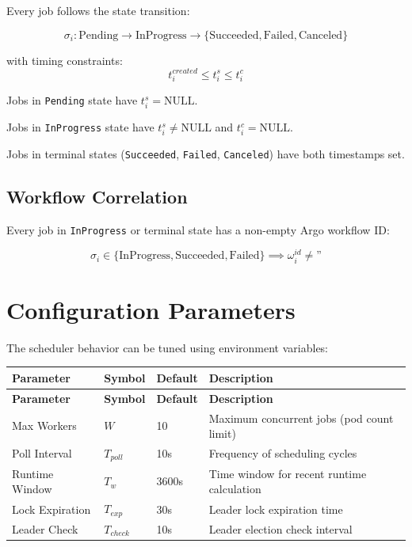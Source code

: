 \documentclass[11pt]{article}
\begin{document}
Every job follows the state transition:

\begin{equation}
\sigma_i: \text{Pending} \to \text{InProgress} \to \{\text{Succeeded}, \text{Failed}, \text{Canceled}\}
\end{equation}

with timing constraints:
\begin{equation}
t_i^{created} \leq t_i^s \leq t_i^c
\end{equation}

Jobs in \texttt{Pending} state have $t_i^s = \text{NULL}$.

Jobs in \texttt{InProgress} state have $t_i^s \neq \text{NULL}$ and $t_i^c = \text{NULL}$.

Jobs in terminal states (\texttt{Succeeded}, \texttt{Failed}, \texttt{Canceled}) have both timestamps set.

\subsection{Workflow Correlation}

Every job in \texttt{InProgress} or terminal state has a non-empty Argo workflow ID:

\begin{equation}
\sigma_i \in \{\text{InProgress}, \text{Succeeded}, \text{Failed}\} \implies \omega_i^{id} \neq \text{''}
\end{equation}

\section{Configuration Parameters}

The scheduler behavior can be tuned using environment variables:

\begin{center}
\begin{longtable}{p{3.5cm}p{1.5cm}p{2cm}p{7cm}}
\toprule
\textbf{Parameter} & \textbf{Symbol} & \textbf{Default} & \textbf{Description} \\
\midrule
\endfirsthead

\toprule
\textbf{Parameter} & \textbf{Symbol} & \textbf{Default} & \textbf{Description} \\
\midrule
\endhead

\midrule
\endfoot

\bottomrule
\endlastfoot

Max Workers & $W$ & 10 & Maximum concurrent jobs (pod count limit) \\
Poll Interval & $T_{poll}$ & 10s & Frequency of scheduling cycles \\
Runtime Window & $T_w$ & 3600s & Time window for recent runtime calculation \\
Lock Expiration & $T_{exp}$ & 30s & Leader lock expiration time \\
Leader Check & $T_{check}$ & 10s & Leader election check interval \\
\end{longtable}
\end{center}
\end{document}
